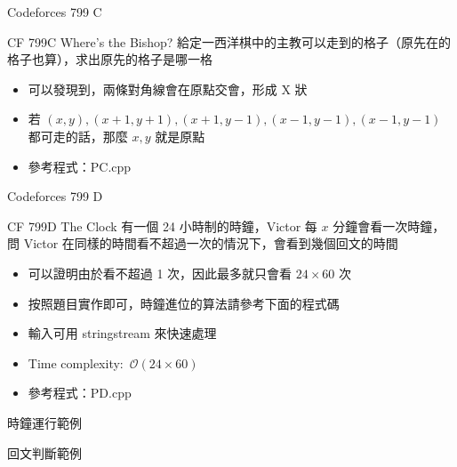 \documentclass[aspectratio=169]{beamer}
\begin{document}
    \begin{frame}{Codeforces 799 C}
    	\begin{block}{CF 799C Where's the Bishop?}
    		給定一西洋棋中的主教可以走到的格子（原先在的格子也算），求出原先的格子是哪一格
    	\end{block}
    	
    	\begin{itemize}
    		\item 可以發現到，兩條對角線會在原點交會，形成 X 狀
    		\item 若 $(x,y),(x+1,y+1),(x+1,y-1),(x-1,y-1),(x-1,y-1)$ 都可走的話，那麼 $x,y$ 就是原點
    		\item 參考程式：PC.cpp
    	\end{itemize}
    \end{frame}
    
    \begin{frame}{Codeforces 799 D}
    	\begin{block}{CF 799D The Clock}
    		有一個 24 小時制的時鐘，Victor 每 $x$ 分鐘會看一次時鐘，問 Victor 在同樣的時間看不超過一次的情況下，會看到幾個回文的時間
    	\end{block}
    	
    	\begin{itemize}
    		\item 可以證明由於看不超過 1 次，因此最多就只會看 $24 \times 60$ 次
    		\item 按照題目實作即可，時鐘進位的算法請參考下面的程式碼
    		\item 輸入可用 stringstream 來快速處理
    		\item Time complexity:\ $\mathcal{O}(24 \times 60)$
    		\item 參考程式：PD.cpp
    	\end{itemize}
		
    \end{frame}
    
    \begin{frame}
    
    	\center 時鐘運行範例
		

    	\center 回文判斷範例    	
		

		
    \end{frame}
    
\end{document}
